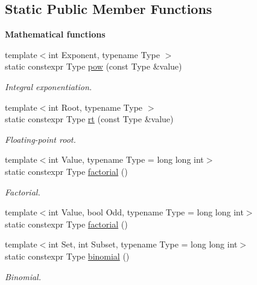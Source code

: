 \subsection*{Static Public Member Functions}
\begin{Indent}{\bf Mathematical functions}\par
\begin{DoxyCompactItemize}
\item 
{\footnotesize template$<$int Exponent, typename Type $>$ }\\static constexpr Type \hyperlink{classmagrathea_1_1AbstractShape_addc3d8958b27b24b554a7753260e26fb}{pow} (const Type \&value)
\begin{DoxyCompactList}\small\item\em Integral exponentiation. \end{DoxyCompactList}\item 
{\footnotesize template$<$int Root, typename Type $>$ }\\static constexpr Type \hyperlink{classmagrathea_1_1AbstractShape_acfe83657f79a6fcbe5d9738e1eb21c47}{rt} (const Type \&value)
\begin{DoxyCompactList}\small\item\em Floating-\/point root. \end{DoxyCompactList}\item 
{\footnotesize template$<$int Value, typename Type  = long long int$>$ }\\static constexpr Type \hyperlink{classmagrathea_1_1AbstractShape_a504662ac2e5983fa9d4b1fe83687f455}{factorial} ()
\begin{DoxyCompactList}\small\item\em Factorial. \end{DoxyCompactList}\item 
{\footnotesize template$<$int Value, bool Odd, typename Type  = long long int$>$ }\\static constexpr Type \hyperlink{classmagrathea_1_1AbstractShape_ab1ea9fd7a67575173ec2f972f1762718}{factorial} ()
\item 
{\footnotesize template$<$int Set, int Subset, typename Type  = long long int$>$ }\\static constexpr Type \hyperlink{classmagrathea_1_1AbstractShape_afac5f2f05a6266a88c0fd3958ec4bdb2}{binomial} ()
\begin{DoxyCompactList}\small\item\em Binomial. \end{DoxyCompactList}\item 

\end{DoxyCompactItemize}
\end{Indent}

